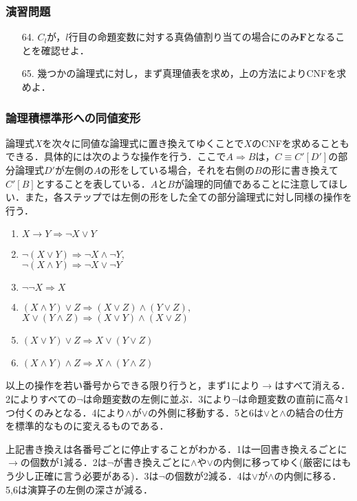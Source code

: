 \documentclass{ltjsarticle}
\theoremstyle{mystyle1}
\theoremstyle{mystyle2}
\newcommand{\bF}{\ensuremath{\mathbf{F}}}
\begin{document}
\subsubsection*{演習問題}
\begin{enumerate}
  \item[64.] $C_l$が，$l$行目の命題変数に対する真偽値割り当ての場合にのみ$\bF$となることを確認せよ．
  \item[65.] 幾つかの論理式に対し，まず真理値表を求め，上の方法によりCNFを求めよ．
\end{enumerate}
\subsubsection{論理積標準形への同値変形}
論理式$X$を次々に同値な論理式に置き換えてゆくことで$X$のCNFを求めることもできる．具体的には次のような操作を行う．ここで$A\Rightarrow B$は，$C\equiv C'[D']$の部分論理式$D'$が左側の$A$の形をしている場合，それを右側の$B$の形に書き換えて$C'[B]$とすることを表している．$A$と$B$が論理的同値であることに注意してほしい．また，各ステップでは左側の形をした全ての部分論理式に対し同様の操作を行う．
\begin{enumerate}
  \item $X\to Y\Rightarrow\neg X\vee Y$
  \item $\neg(X\vee Y)\Rightarrow\neg X\wedge\neg Y,$\\$\neg(X\wedge Y)\Rightarrow\neg X\vee\neg Y$
  \item $\neg\neg X\Rightarrow X$
  \item $(X\wedge Y)\vee Z \Rightarrow (X\vee Z)\wedge (Y \vee Z),$\\$X\vee(Y\wedge Z)\Rightarrow (X\vee Y)\wedge(X\vee Z)$
  \item $(X\vee Y)\vee Z \Rightarrow X\vee(Y\vee Z)$
  \item $(X\wedge Y)\wedge Z\Rightarrow X \wedge(Y \wedge Z)$
\end{enumerate}
以上の操作を若い番号からできる限り行うと，まず1により$\to$はすべて消える．2によりすべての$\neg$は命題変数の左側に並ぶ．3により$\neg$は命題変数の直前に高々1つ付くのみとなる．4により$\wedge$が$\vee$の外側に移動する．5と6は$\vee$と$\wedge$の結合の仕方を標準的なものに変えるものである．

上記書き換えは各番号ごとに停止することがわかる．1は一回書き換えるごとに$\to$の個数が1減る．2は$\neg$が書き換えごとに$\wedge$や$\vee$の内側に移ってゆく(厳密にはもう少し正確に言う必要がある)．3は$\neg$の個数が2減る．4は$\vee$が$\wedge$の内側に移る．5,6は演算子の左側の深さが減る．
\end{document}
